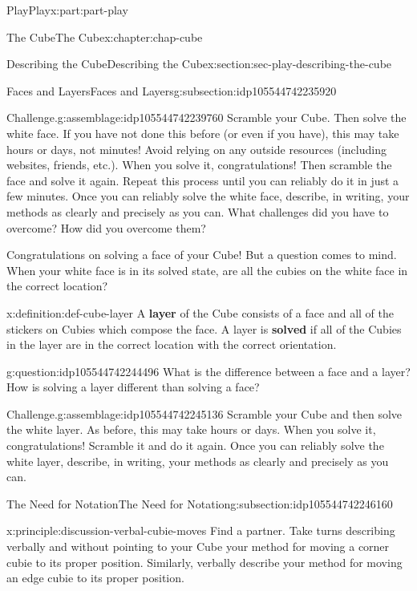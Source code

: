 \documentclass[oneside,10pt,]{book}
\newcommand{\terminology}[1]{\textbf{#1}}
\numberwithin{equation}{section}
\begin{document}
\begin{partptx}{Play}{}{Play}{}{}{x:part:part-play}
\begin{chapterptx}{The Cube}{}{The Cube}{}{}{x:chapter:chap-cube}
\begin{sectionptx}{Describing the Cube}{}{Describing the Cube}{}{}{x:section:sec-play-describing-the-cube}
\begin{subsectionptx}{Faces and Layers}{}{Faces and Layers}{}{}{g:subsection:idp105544742235920}
\begin{assemblage}{Challenge.}{g:assemblage:idp105544742239760}
Scramble your Cube. Then solve the white face. If you have not done this before (or even if you have), this may take hours or days, not minutes! Avoid relying on any outside resources (including websites, friends, etc.). When you solve it, congratulations! Then scramble the face and solve it again. Repeat this process until you can reliably do it in just a few minutes. Once you can reliably solve the white face, describe, in writing, your methods as clearly and precisely as you can. What challenges did you have to overcome? How did you overcome them?%
\end{assemblage}
Congratulations on solving a face of your Cube! But a question comes to mind. When your white face is in its solved state, are all the cubies on the white face in the correct location?%
\begin{definition}{}{x:definition:def-cube-layer}%
%
%
%
A \terminology{layer} of the Cube consists of a face and all of the stickers on Cubies which compose the face. A layer is \terminology{solved} if all of the Cubies in the layer are in the correct location with the correct orientation.%
\end{definition}
\begin{question}{}{g:question:idp105544742244496}%
What is the difference between a face and a layer? How is solving a layer different than solving a face?%
\end{question}
\begin{assemblage}{Challenge.}{g:assemblage:idp105544742245136}%
Scramble your Cube and then solve the white layer. As before, this may take hours or days. When you solve it, congratulations! Scramble it and do it again. Once you can reliably solve the white layer, describe, in writing, your methods as clearly and precisely as you can.%
\end{assemblage}
\end{subsectionptx}
%
%
\typeout{************************************************}
\typeout{************************************************}
%
\begin{subsectionptx}{The Need for Notation}{}{The Need for Notation}{}{}{g:subsection:idp105544742246160}
\begin{principle}{}{}{x:principle:discussion-verbal-cubie-moves}%
Find a partner. Take turns describing verbally and without pointing to your Cube your method for moving a corner cubie to its proper position. Similarly, verbally describe your method for moving an edge cubie to its proper position.%

\end{principle}
\end{subsectionptx}
\end{sectionptx}
\end{chapterptx}
\end{partptx}
\end{document}
